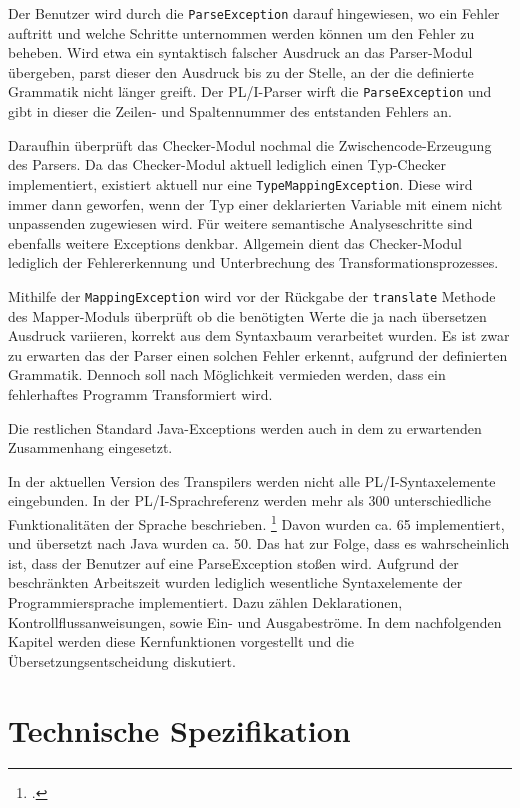 Der Benutzer wird durch die \verb+ParseException+ darauf hingewiesen, wo ein Fehler auftritt und welche Schritte unternommen werden können um den Fehler zu beheben.
Wird etwa ein syntaktisch falscher Ausdruck an das Parser-Modul übergeben, parst dieser den Ausdruck
bis zu der Stelle, an der die definierte Grammatik nicht länger greift.
Der PL/I-Parser wirft die \verb+ParseException+ und gibt in dieser die Zeilen- und Spaltennummer des
entstanden Fehlers an.

Daraufhin überprüft das Checker-Modul nochmal die Zwischencode-Erzeugung des Parsers.
Da das Checker-Modul aktuell lediglich einen Typ-Checker implementiert, existiert aktuell nur eine \verb+TypeMappingException+.
Diese wird immer dann geworfen, wenn der Typ einer deklarierten Variable mit einem nicht unpassenden zugewiesen wird.
Für weitere semantische Analyseschritte sind ebenfalls weitere Exceptions denkbar. Allgemein dient das Checker-Modul lediglich der Fehlererkennung und Unterbrechung des Transformationsprozesses.

Mithilfe der \verb+MappingException+ wird vor der Rückgabe der \verb+translate+ Methode des Mapper-Moduls überprüft ob 
die benötigten Werte die ja nach übersetzen Ausdruck variieren, korrekt aus dem Syntaxbaum verarbeitet wurden.
Es ist zwar zu erwarten das der Parser einen solchen Fehler erkennt, aufgrund der definierten Grammatik.
Dennoch soll nach Möglichkeit vermieden werden, dass ein fehlerhaftes Programm Transformiert wird.

Die restlichen Standard Java-Exceptions werden auch in dem zu erwartenden Zusammenhang eingesetzt.

In der aktuellen Version des Transpilers werden nicht alle PL/I-Syntaxelemente eingebunden.
In der PL/I-Sprachreferenz werden mehr als 300 unterschiedliche Funktionalitäten der Sprache beschrieben. \footcite[Vgl. ][S. 5ff.]{pliref}
Davon wurden ca. 65 implementiert, und übersetzt nach Java wurden ca. 50.
Das hat zur Folge, dass es wahrscheinlich ist, dass der Benutzer auf eine ParseException stoßen wird.
Aufgrund der beschränkten Arbeitszeit wurden lediglich wesentliche Syntaxelemente der Programmiersprache implementiert.
Dazu zählen Deklarationen, Kontrollflussanweisungen, sowie Ein- und Ausgabeströme.
In dem nachfolgenden Kapitel werden diese Kernfunktionen vorgestellt und die Übersetzungsentscheidung
diskutiert. 

\pagebreak
\section{Technische Spezifikation}
